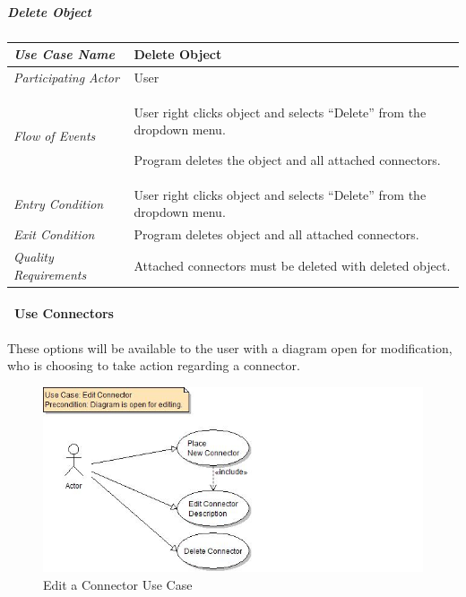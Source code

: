 \documentclass[twoside,letterpaper]{article}
\newenvironment{my_enumerate}{
\begin{enumerate}
  \setlength{\itemsep}{1pt}
  \setlength{\parskip}{0pt}
  \setlength{\parsep}{0pt}}{\end{enumerate}
}
\begin{document}

\clearpage

\subparagraph[\ Delete Object ] 
{\bfseries Delete Object }

\begin{flushleft}
\tablehead{}
\begin{tabular}{|m{2.0in} m{5.0in}|}
\hline
{\bfseries\emph{Use Case Name}}
& {\bfseries Delete Object}
\\\hline
\emph{Participating Actor}
& User
\\\hline
\emph{Flow of Events}
& \begin{my_enumerate}
\item User right clicks object and selects ``Delete'' from the dropdown menu.
\item Program deletes the object and all attached connectors. 
\end{my_enumerate}
\\\hline
\emph{Entry Condition}
& User right clicks object and selects ``Delete'' from the dropdown menu.
\\\hline
\emph{Exit Condition}
& Program deletes object and all attached connectors.
\\\hline
\emph{Quality Requirements}
& Attached connectors must be deleted with deleted object. 
\\\hline
\end{tabular}
\end{flushleft}
\bigskip



\clearpage

\paragraph[\ Use Connectors ]
{\ Use Connectors} {These options will be available to the user with a diagram open for modification, who is choosing to take action regarding a connector.}

\begin{figure}[h]
\centering
\includegraphics[width=6.0in]{ucaseEditConn.jpg}
\caption{Edit a Connector Use Case}
\end{figure}
\end{document}
